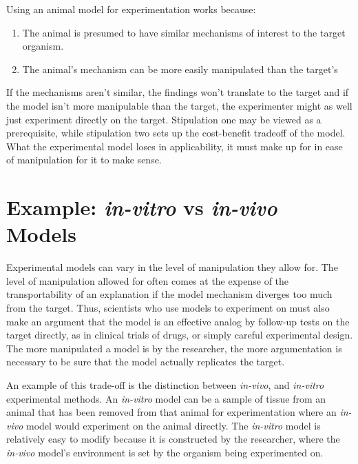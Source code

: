 Using an animal model for experimentation works because:

\begin{enumerate}
\def\labelenumi{\arabic{enumi}.}
\tightlist
\item
  The animal is presumed to have similar mechanisms of interest to the
  target organism.
\item
  The animal's mechanism can be more easily manipulated than the
  target's
\end{enumerate}

If the mechanisms aren't similar, the findings won't translate to the
target and if the model isn't more manipulable than the target, the
experimenter might as well just experiment directly on the target.
Stipulation one may be viewed as a prerequisite, while stipulation two
sets up the cost-benefit tradeoff of the model. What the experimental
model loses in applicability, it must make up for in ease of
manipulation for it to make sense.

\hypertarget{example-in-vitro-vs-in-vivo-models}{%
\section{\texorpdfstring{Example: \emph{in-vitro} vs \emph{in-vivo}
Models}{Example: in-vitro vs in-vivo Models}}\label{example-in-vitro-vs-in-vivo-models}}

Experimental models can vary in the level of manipulation they allow
for. The level of manipulation allowed for often comes at the expense of
the transportability of an explanation if the model mechanism diverges
too much from the target. Thus, scientists who use models to experiment
on must also make an argument that the model is an effective analog by
follow-up tests on the target directly, as in clinical trials of drugs,
or simply careful experimental design. The more manipulated a model is
by the researcher, the more argumentation is necessary to be sure that
the model actually replicates the target.

An example of this trade-off is the distinction between \emph{in-vivo},
and \emph{in-vitro} experimental methods. An \emph{in-vitro} model can
be a sample of tissue from an animal that has been removed from that
animal for experimentation where an \emph{in-vivo} model would
experiment on the animal directly. The \emph{in-vitro} model is
relatively easy to modify because it is constructed by the researcher,
where the \emph{in-vivo} model's environment is set by the organism
being experimented on.

